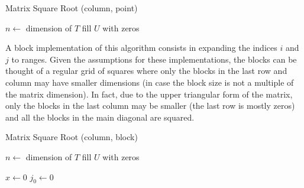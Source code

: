 \documentclass[../thesis]{subfiles}
\begin{document}
	\begin{algorithm}[htp]
		\caption{Matrix Square Root (column, point)}
		\label{alg:sqrtm:column:point}
		\DontPrintSemicolon


		$n \leftarrow$ dimension of $T$\;
		fill $U$ with zeros\;

	\end{algorithm}

	A block implementation of this algorithm consists in expanding the indices $i$ and $j$ to ranges. Given the assumptions for these implementations, the blocks can be thought of a regular grid of squares where only the blocks in the last row and column may have smaller dimensions (in case the block size is not a multiple of the matrix dimension). In fact, due to the upper triangular form of the matrix, only the blocks in the last column may be smaller (the last row is mostly zeros) and all the blocks in the main diagonal are squared.

	\begin{algorithm}[htp]
		\caption{Matrix Square Root (column, block)}
		\label{alg:sqrtm:column:block}
		\DontPrintSemicolon


		$n \leftarrow$ dimension of $T$\;
		fill $U$ with zeros\;

		$x \leftarrow 0$\;
		$j_0 \leftarrow 0$\;
	\end{algorithm}
\end{document}
